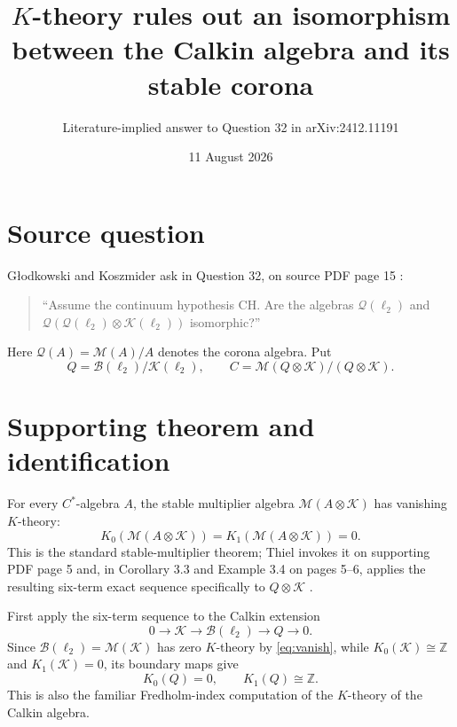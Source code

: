 \documentclass[11pt]{article}
\title{$K$-theory rules out an isomorphism between the Calkin algebra and its stable corona}
\author{Literature-implied answer to Question 32 in arXiv:2412.11191}
\date{11 August 2026}
\newcommand{\K}{\mathcal K}
\newcommand{\Q}{\mathcal Q}
\newcommand{\M}{\mathcal M}
\newcommand{\B}{\mathcal B}
\begin{document}
\maketitle

\begin{center}
\end{center}

\section*{Source question}
G\l odkowski and Koszmider ask in Question 32, on source PDF page 15 \cite{Source}:
\begin{quote}
``Assume the continuum hypothesis CH. Are the algebras $\Q(\ell_2)$ and $\Q(\Q(\ell_2)\otimes\K(\ell_2))$ isomorphic?''
\end{quote}
Here $\Q(A)=\M(A)/A$ denotes the corona algebra.  Put
\[
 Q=\B(\ell_2)/\K(\ell_2),
 \qquad
 C=\M(Q\otimes\K)/(Q\otimes\K).
\]

\section*{Supporting theorem and identification}
For every $C^*$-algebra $A$, the stable multiplier algebra $\M(A\otimes\K)$ has vanishing $K$-theory:
\begin{equation}\label{eq:vanish}
 K_0(\M(A\otimes\K))=K_1(\M(A\otimes\K))=0.
\end{equation}
This is the standard stable-multiplier theorem; Thiel invokes it on supporting PDF page 5 and, in Corollary 3.3 and Example 3.4 on pages 5--6, applies the resulting six-term exact sequence specifically to $Q\otimes\K$ \cite{Thiel}.

First apply the six-term sequence to the Calkin extension
\[
 0\longrightarrow\K\longrightarrow\B(\ell_2)
 \longrightarrow Q\longrightarrow0.
\]
Since $\B(\ell_2)=\M(\K)$ has zero $K$-theory by \eqref{eq:vanish}, while
$K_0(\K)\cong\mathbb Z$ and $K_1(\K)=0$, its boundary maps give
\begin{equation}\label{eq:q}
 K_0(Q)=0,
 \qquad
 K_1(Q)\cong\mathbb Z.
\end{equation}
This is also the familiar Fredholm-index computation of the $K$-theory of the Calkin algebra.
\end{document}
